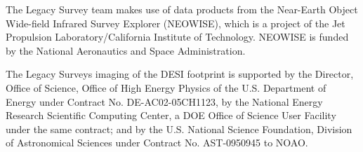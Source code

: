 \documentclass[modern,linenumbers]{aastex701}
\begin{document}
\begin{acknowledgements}
The Legacy Survey team makes use of data products from the Near-Earth
Object Wide-field Infrared Survey Explorer (NEOWISE), which is a
project of the Jet Propulsion Laboratory/California Institute of
Technology. NEOWISE is funded by the National Aeronautics and Space
Administration.

The Legacy Surveys imaging of the DESI footprint is supported by the
Director, Office of Science, Office of High Energy Physics of the
U.S. Department of Energy under Contract No. DE-AC02-05CH1123, by the
National Energy Research Scientific Computing Center, a DOE Office of
Science User Facility under the same contract; and by the
U.S. National Science Foundation, Division of Astronomical Sciences
under Contract No. AST-0950945 to NOAO.
\end{acknowledgements}

\end{document}
